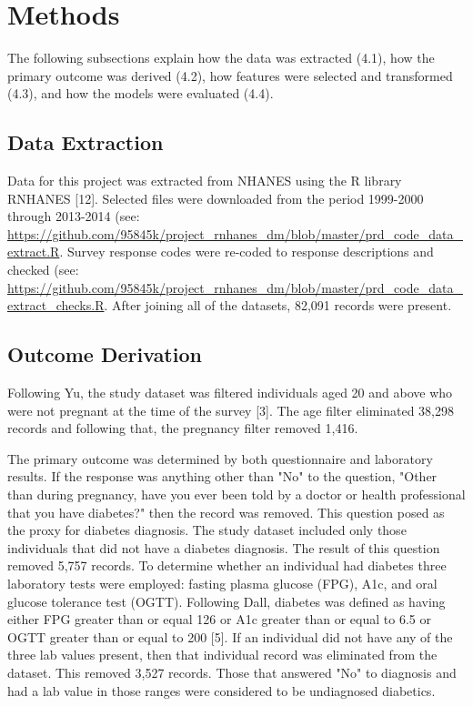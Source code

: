 \documentclass[twoside,11pt]{article}
\begin{document}
\section{Methods} \label{methods}
The following subsections explain how the data was extracted (4.1), how the primary outcome was derived (4.2), how features were selected and transformed (4.3), and how the models were evaluated (4.4). 

\subsection{Data Extraction} 
Data for this project was extracted from NHANES using the R library RNHANES [12]. Selected files were downloaded from the period 1999-2000 through 2013-2014 (see: \url{https://github.com/95845k/project_rnhanes_dm/blob/master/prd_code_data_extract.R}. Survey response codes were re-coded to response descriptions and checked (see: \url{https://github.com/95845k/project_rnhanes_dm/blob/master/prd_code_data_extract_checks.R}. After joining all of the datasets, 82,091 records were present. 

\subsection{Outcome Derivation} 
Following Yu, the study dataset was filtered individuals aged 20 and above who were not pregnant at the time of the survey [3]. The age filter eliminated 38,298 records and following that, the pregnancy filter removed 1,416. 

The primary outcome was determined by both questionnaire and laboratory results. If the response was anything other than "No" to the question, "Other than during pregnancy, have you ever been told by a doctor or health professional that you have diabetes?" then the record was removed. This question posed as the proxy for diabetes diagnosis. The study dataset included only those individuals that did not have a diabetes diagnosis. The result of this question removed 5,757 records. To determine whether an individual had diabetes three laboratory tests were employed: fasting plasma glucose (FPG), A1c, and oral glucose tolerance test (OGTT). Following Dall, diabetes was defined as having either FPG greater than or equal 126 or A1c greater than or equal to 6.5 or OGTT greater than or equal to 200 [5]. If an individual did not have any of the three lab values present, then that individual record was eliminated from the dataset. This removed 3,527 records. Those that answered "No" to diagnosis and had a lab value in those ranges were considered to be undiagnosed diabetics. 
\end{document}
